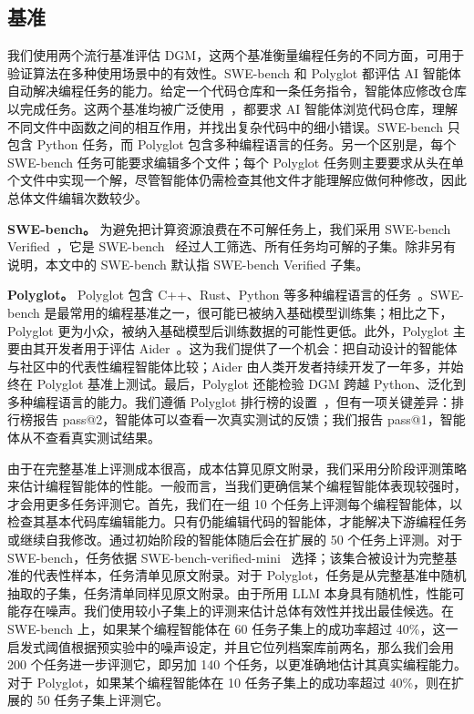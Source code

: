 \documentclass[10pt,twocolumn]{article}
\begin{document}
\subsection{基准}
\label{sec:benchmarks}

我们使用两个流行基准评估 DGM，这两个基准衡量编程任务的不同方面，可用于验证算法在多种使用场景中的有效性。SWE-bench 和 Polyglot 都评估 AI 智能体自动解决编程任务的能力。给定一个代码仓库和一条任务指令，智能体应修改仓库以完成任务。这两个基准均被广泛使用~\citep{zhang2024autocoderover,zhang2024rest,xia2024agentless,cao2024spider2,GoogleDeepMind2025GeminiThinking,aider2024}，都要求 AI 智能体浏览代码仓库，理解不同文件中函数之间的相互作用，并找出复杂代码中的细小错误。SWE-bench 只包含 Python 任务，而 Polyglot 包含多种编程语言的任务。另一个区别是，每个 SWE-bench 任务可能要求编辑多个文件；每个 Polyglot 任务则主要要求从头在单个文件中实现一个解，尽管智能体仍需检查其他文件才能理解应做何种修改，因此总体文件编辑次数较少。

\textbf{SWE-bench。}
为避免把计算资源浪费在不可解任务上，我们采用 SWE-bench Verified~\citep{openai2024sweverified}，它是 SWE-bench~\citep{jimenez2024swebench} 经过人工筛选、所有任务均可解的子集。除非另有说明，本文中的 SWE-bench 默认指 SWE-bench Verified 子集。

\textbf{Polyglot。}
Polyglot 包含 C++、Rust、Python 等多种编程语言的任务~\citep{gauthier2024polyglot}。SWE-bench 是最常用的编程基准之一，很可能已被纳入基础模型训练集；相比之下，Polyglot 更为小众，被纳入基础模型后训练数据的可能性更低。此外，Polyglot 主要由其开发者用于评估 Aider~\citep{aider2024}。这为我们提供了一个机会：把自动设计的智能体与社区中的代表性编程智能体比较；Aider 由人类开发者持续开发了一年多，并始终在 Polyglot 基准上测试。最后，Polyglot 还能检验 DGM 跨越 Python、泛化到多种编程语言的能力。我们遵循 Polyglot 排行榜的设置~\citep{gauthier2024polyglot}，但有一项关键差异：排行榜报告 pass@2，智能体可以查看一次真实测试的反馈；我们报告 pass@1，智能体从不查看真实测试结果。

由于在完整基准上评测成本很高，成本估算见原文附录，我们采用分阶段评测策略来估计编程智能体的性能。一般而言，当我们更确信某个编程智能体表现较强时，才会用更多任务评测它。首先，我们在一组 10 个任务上评测每个编程智能体，以检查其基本代码库编辑能力。只有仍能编辑代码的智能体，才能解决下游编程任务或继续自我修改。通过初始阶段的智能体随后会在扩展的 50 个任务上评测。对于 SWE-bench，任务依据 SWE-bench-verified-mini~\citep{hobbhahn2025swebenchmini} 选择；该集合被设计为完整基准的代表性样本，任务清单见原文附录。对于 Polyglot，任务是从完整基准中随机抽取的子集，任务清单同样见原文附录。由于所用 LLM 本身具有随机性，性能可能存在噪声。我们使用较小子集上的评测来估计总体有效性并找出最佳候选。在 SWE-bench 上，如果某个编程智能体在 60 任务子集上的成功率超过 40\%，这一启发式阈值根据预实验中的噪声设定，并且它位列档案库前两名，那么我们会用 200 个任务进一步评测它，即另加 140 个任务，以更准确地估计其真实编程能力。对于 Polyglot，如果某个编程智能体在 10 任务子集上的成功率超过 40\%，则在扩展的 50 任务子集上评测它。
\end{document}
